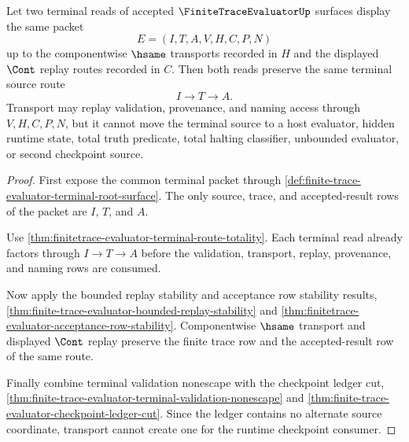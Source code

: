 \begin{theorem}
\label{thm:finitetrace-evaluator-terminal-source-stability}
Let two terminal reads of accepted $\FiniteTraceEvaluatorUp$ surfaces display
the same packet
$$
E=(I,T,A,V,H,C,P,N)
$$
up to the componentwise $\hsame$ transports recorded in $H$ and the displayed
$\Cont$ replay routes recorded in $C$. Then both reads preserve the same
terminal source route
$$
I \to T \to A.
$$
Transport may replay validation, provenance, and naming access through
$V,H,C,P,N$, but it cannot move the terminal source to a host evaluator,
hidden runtime state, total truth predicate, total halting classifier,
unbounded evaluator, or second checkpoint source.
\end{theorem}
\begin{proof}
First expose the common terminal packet through
\autoref{def:finite-trace-evaluator-terminal-root-surface}. The only source,
trace, and accepted-result rows of the packet are $I$, $T$, and $A$.

Use \autoref{thm:finitetrace-evaluator-terminal-route-totality}. Each terminal
read already factors through $I \to T \to A$ before the validation,
transport, replay, provenance, and naming rows are consumed.

Now apply the bounded replay stability and acceptance row stability results,
\autoref{thm:finite-trace-evaluator-bounded-replay-stability} and
\autoref{thm:finitetrace-evaluator-acceptance-row-stability}. Componentwise
$\hsame$ transport and displayed $\Cont$ replay preserve the finite trace row
and the accepted-result row of the same route.

Finally combine terminal validation nonescape with the checkpoint ledger cut,
\autoref{thm:finite-trace-evaluator-terminal-validation-nonescape} and
\autoref{thm:finite-trace-evaluator-checkpoint-ledger-cut}. Since the ledger
contains no alternate source coordinate, transport cannot create one for the
runtime checkpoint consumer.
\end{proof}


